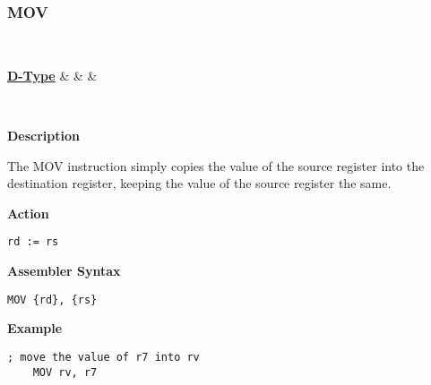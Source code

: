 \subsubsection{MOV }\label{sec:MOV}

\vspace{3ex}

\begin{center}
	\begin{bytefield}[leftcurly=., leftcurlyspace=0pt]{32}
		 \\
		\begin{leftwordgroup}{\hyperref[sec:d-type]{\textbf{D-Type}}}
		 & 
		 &
		 &
		\end{leftwordgroup}\\
	\end{bytefield}
\end{center}

\textbf{Description}

The MOV instruction simply copies the value of the source register into the destination register, keeping the value of the source register the same.

\vspace{3ex}

\textbf{Action}
\begin{lstlisting}[frame=single]
	rd := rs
\end{lstlisting}

\vspace{3ex}

\textbf{Assembler Syntax}
\begin{lstlisting}[frame=single]
	MOV {rd}, {rs}
\end{lstlisting}

\vspace{3ex}

\textbf{Example}
\begin{lstlisting}[frame=single]
	; move the value of r7 into rv
	MOV rv, r7
\end{lstlisting}